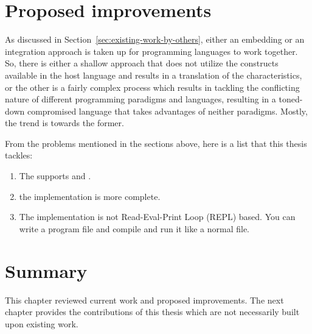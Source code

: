 \documentclass[thesis-solanki.tex]{subfiles}
\begin{document}
\section{Proposed improvements}\label{sec:things-fixed}

As discussed in Section~\ref{sec:existing-work-by-others},
either an embedding or an integration approach is taken up for programming languages to work together.
So, there is either a shallow approach that does not utilize the constructs available in the host language and
results in a translation of the characteristics, or the other is a fairly complex process which results in tackling
the conflicting nature of different programming paradigms and languages, resulting in a toned-down compromised
language that takes advantages of neither paradigms.
Mostly, the trend is towards the former.


From the problems mentioned in the sections above, here is a list that this thesis tackles:
\begin{enumerate}
\item The  supports  and .

\item the implementation is more complete.

\item The implementation is not  Read-Eval-Print Loop (REPL) based. You can write a program file and compile and run it like a normal  file.
\end{enumerate}

\section{Summary}
This chapter reviewed current work and proposed improvements. The next chapter
provides the contributions of this thesis which are not necessarily built upon existing work.

\ifMain
\begin{scope}
  \nolinenumbers
  \enotesize
  \par
  \begin{singlespace}
  \setlength{\parskip}{12pt plus 2pt minus 1pt}
  \theendnotes
  \par
  \end{singlespace}
\end{scope}
\fi
\end{document}
